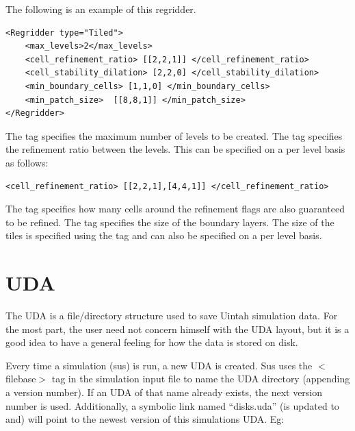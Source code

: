 The following is an example of this regridder.

\begin{Verbatim}[fontsize=\footnotesize]
<Regridder type="Tiled">
    <max_levels>2</max_levels>
    <cell_refinement_ratio> [[2,2,1]] </cell_refinement_ratio>
    <cell_stability_dilation> [2,2,0] </cell_stability_dilation>
    <min_boundary_cells> [1,1,0] </min_boundary_cells>
    <min_patch_size>  [[8,8,1]] </min_patch_size>
</Regridder>
\end{Verbatim}

The  tag specifies the maximum number of levels
to be created.  The  tag specifies the
refinement ratio between the levels.  This can be specified on a per
level basis as follows:

\begin{Verbatim}[fontsize=\footnotesize]
    <cell_refinement_ratio> [[2,2,1],[4,4,1]] </cell_refinement_ratio>
\end{Verbatim}

The  tag specifies how many cells around
the refinement flags are also guaranteed to be refined.  The
 tag specifies the size of the boundary layers.
The size of the tiles is specified using the  tag
and can also be specified on a per level basis.

%


\section{UDA}


The UDA is a file/directory structure used to save Uintah simulation
data.  For the most part, the user need not concern himself with the
UDA layout, but it is a good idea to have a general feeling for how
the data is stored on disk.


Every time a simulation (sus) is run, a new UDA is created.  Sus uses
the $<$filebase$>$ tag in the simulation input file to name the UDA
directory (appending a version number).  If an UDA of that name
already exists, the next version number is used.  Additionally, a
symbolic link named ``disks.uda'' (is updated to and) will point to
the newest version of this simulations UDA.  Eg:

